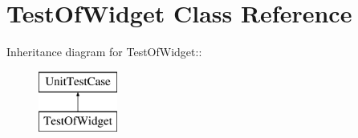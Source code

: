 \hypertarget{class_test_of_widget}{
\section{TestOfWidget Class Reference}
\label{class_test_of_widget}
}
Inheritance diagram for TestOfWidget::\begin{figure}[H]
\begin{center}
\leavevmode
\includegraphics[height=2cm]{class_test_of_widget}
\end{center}
\end{figure}
